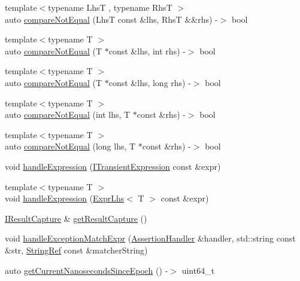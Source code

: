 \begin{DoxyCompactItemize}
{\footnotesize template$<$typename LhsT , typename RhsT $>$ }\\auto \mbox{\hyperlink{namespace_catch_a8bec217f5ef5f09c17074c311c958f3c}{compare\+Not\+Equal}} (LhsT const \&lhs, RhsT \&\&rhs) -\/$>$ bool
\item 
{\footnotesize template$<$typename T $>$ }\\auto \mbox{\hyperlink{namespace_catch_aa81c95898f22dce1f61d7710e495d1ee}{compare\+Not\+Equal}} (T $\ast$const \&lhs, int rhs) -\/$>$ bool
\item 
{\footnotesize template$<$typename T $>$ }\\auto \mbox{\hyperlink{namespace_catch_adad6539b3780b9a8953221efd038e2e4}{compare\+Not\+Equal}} (T $\ast$const \&lhs, long rhs) -\/$>$ bool
\item 
{\footnotesize template$<$typename T $>$ }\\auto \mbox{\hyperlink{namespace_catch_adb4b3e912b89a987025ca28cf0c92ba8}{compare\+Not\+Equal}} (int lhs, T $\ast$const \&rhs) -\/$>$ bool
\item 
{\footnotesize template$<$typename T $>$ }\\auto \mbox{\hyperlink{namespace_catch_a3db634a0adf44a1148767ba149ccf34d}{compare\+Not\+Equal}} (long lhs, T $\ast$const \&rhs) -\/$>$ bool
\item 
void \mbox{\hyperlink{namespace_catch_a65af25091f2ab61056e166765963e525}{handle\+Expression}} (\mbox{\hyperlink{struct_catch_1_1_i_transient_expression}{I\+Transient\+Expression}} const \&expr)
\item 
{\footnotesize template$<$typename T $>$ }\\void \mbox{\hyperlink{namespace_catch_af2c93db76668a981e75ae835699efce7}{handle\+Expression}} (\mbox{\hyperlink{class_catch_1_1_expr_lhs}{Expr\+Lhs}}$<$ T $>$ const \&expr)
\item 
\mbox{\hyperlink{struct_catch_1_1_i_result_capture}{I\+Result\+Capture}} \& \mbox{\hyperlink{namespace_catch_aff60c1de6ac6cea30175d70e33d83c8e}{get\+Result\+Capture}} ()
\item 
void \mbox{\hyperlink{namespace_catch_aea6f8ff3b3838829d4a61694e4bc41ca}{handle\+Exception\+Match\+Expr}} (\mbox{\hyperlink{class_catch_1_1_assertion_handler}{Assertion\+Handler}} \&handler, std\+::string const \&str, \mbox{\hyperlink{class_catch_1_1_string_ref}{String\+Ref}} const \&matcher\+String)
\item 
auto \mbox{\hyperlink{namespace_catch_a98d058468488c486a9cb5c8463f3ba29}{get\+Current\+Nanoseconds\+Since\+Epoch}} () -\/$>$ uint64\+\_\+t

\end{DoxyCompactItemize}
